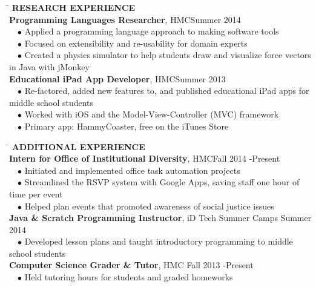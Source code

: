 \documentclass[11pt]{article}
\newcommand{\sectionNL}{\\[-2pt]}
\newcommand{\customtab}{$\hspace{10pt} \bullet \hspace{2pt}$}
\newcommand{\customtabinline}{$\hspace{23pt}$}
\newcommand{\HMC}{HMC}
\begin{document}
\begin{tabbing} 
\hspace*{6.5in}\= \kill
{\textbf{RESEARCH EXPERIENCE} } \> \sectionNL
\textbf{Programming Languages Researcher}, \HMC \>Summer 2014 \\
\customtab Applied a programming language approach to making software tools \\
\customtab Focused on extensibility and re-usability for domain experts \\ 
\customtab Created a physics simulator to help students draw and visualize force vectors in Java with jMonkey\\

\textbf{Educational iPad App Developer}, \HMC \>Summer 2013 \\
\customtab Re-factored, added new features to, and published educational iPad apps for middle school students \\
\customtab Worked with iOS and the Model-View-Controller (MVC) framework \\
\customtab Primary app: HammyCoaster, free on the iTunes Store
\end{tabbing}


\begin{tabbing} 
\hspace*{6.5in}\= \kill
{\textbf{ADDITIONAL EXPERIENCE } } \> \sectionNL
\textbf{Intern for Office of Institutional Diversity}, \HMC \>Fall 2014 -Present \\
\customtab Initiated and implemented office task automation projects\\
\customtab Streamlined the RSVP system with Google Apps, saving staff one hour of time per event  \\
\customtab Helped plan events that promoted awareness of social justice issues \\

\textbf{Java \& Scratch Programming Instructor}, iD Tech Summer Camps \> Summer 2014 \\
\customtab Developed lesson plans and taught introductory programming to  middle school students\\

\textbf{Computer Science Grader \& Tutor}, \HMC \> Fall 2013 -Present \\ %
\customtab Held tutoring hours for students and graded homeworks
\end{tabbing}
\end{document}
